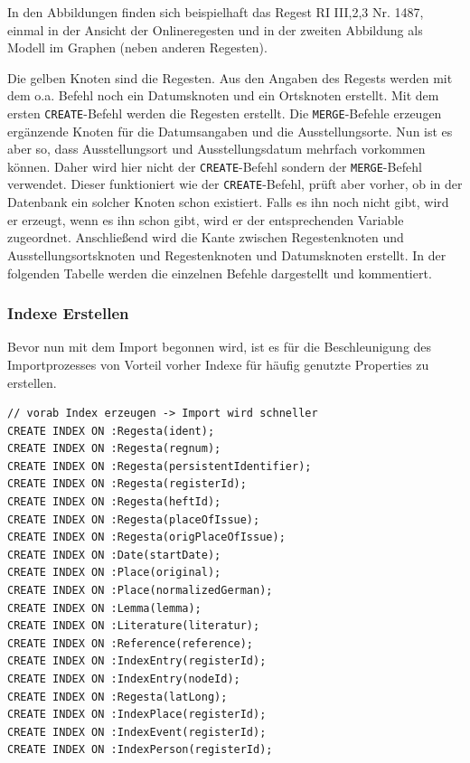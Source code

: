 In den Abbildungen finden sich beispielhaft das Regest RI III,2,3 Nr.
1487, einmal in der Ansicht der Onlineregesten und in der zweiten
Abbildung als Modell im Graphen (neben anderen Regesten).

Die gelben Knoten sind die Regesten. Aus den Angaben des Regests werden
mit dem o.a. Befehl noch ein Datumsknoten und ein Ortsknoten erstellt.
Mit dem ersten \texttt{CREATE}-Befehl werden die Regesten erstellt. Die
\texttt{MERGE}-Befehle erzeugen ergänzende Knoten für die Datumsangaben
und die Ausstellungsorte. Nun ist es aber so, dass Ausstellungsort und
Ausstellungsdatum mehrfach vorkommen können. Daher wird hier nicht der
\texttt{CREATE}-Befehl sondern der \texttt{MERGE}-Befehl verwendet.
Dieser funktioniert wie der \texttt{CREATE}-Befehl, prüft aber vorher,
ob in der Datenbank ein solcher Knoten schon existiert. Falls es ihn
noch nicht gibt, wird er erzeugt, wenn es ihn schon gibt, wird er der
entsprechenden Variable zugeordnet. Anschließend wird die Kante zwischen
Regestenknoten und Ausstellungsortsknoten und Regestenknoten und
Datumsknoten erstellt. In der folgenden Tabelle werden die einzelnen
Befehle dargestellt und kommentiert.

\hypertarget{indexe-erstellen}{%
\subsubsection{Indexe Erstellen}\label{indexe-erstellen}}

Bevor nun mit dem Import begonnen wird, ist es für die Beschleunigung
des Importprozesses von Vorteil vorher Indexe für häufig genutzte
Properties zu erstellen.

\begin{verbatim}
// vorab Index erzeugen -> Import wird schneller
CREATE INDEX ON :Regesta(ident);
CREATE INDEX ON :Regesta(regnum);
CREATE INDEX ON :Regesta(persistentIdentifier);
CREATE INDEX ON :Regesta(registerId);
CREATE INDEX ON :Regesta(heftId);
CREATE INDEX ON :Regesta(placeOfIssue);
CREATE INDEX ON :Regesta(origPlaceOfIssue);
CREATE INDEX ON :Date(startDate);
CREATE INDEX ON :Place(original);
CREATE INDEX ON :Place(normalizedGerman);
CREATE INDEX ON :Lemma(lemma);
CREATE INDEX ON :Literature(literatur);
CREATE INDEX ON :Reference(reference);
CREATE INDEX ON :IndexEntry(registerId);
CREATE INDEX ON :IndexEntry(nodeId);
CREATE INDEX ON :Regesta(latLong);
CREATE INDEX ON :IndexPlace(registerId);
CREATE INDEX ON :IndexEvent(registerId);
CREATE INDEX ON :IndexPerson(registerId);
\end{verbatim}

